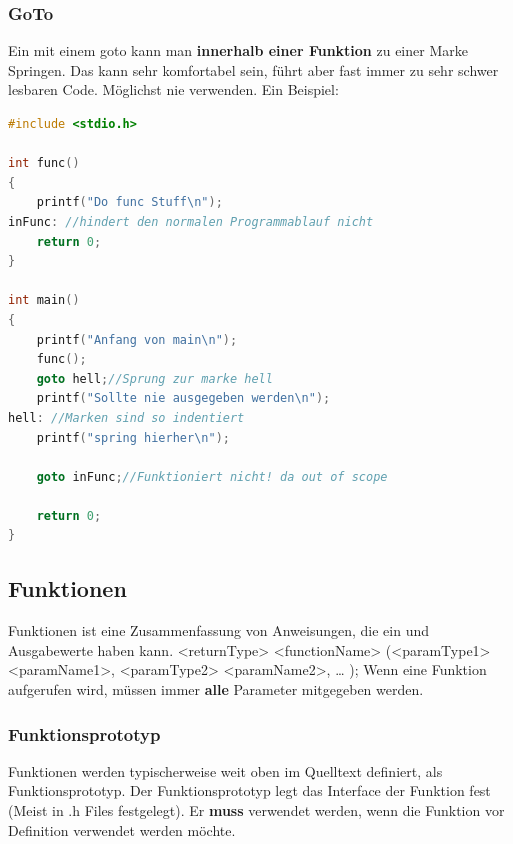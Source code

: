 \subsubsection{GoTo}

Ein mit einem goto kann man \textbf{innerhalb einer Funktion} zu einer Marke Springen. Das kann sehr komfortabel sein, führt aber fast immer zu sehr schwer lesbaren Code. Möglichst nie verwenden.\newline
Ein Beispiel:

\begin{lstlisting}[language = c]
#include <stdio.h>

int func()
{
    printf("Do func Stuff\n");
inFunc: //hindert den normalen Programmablauf nicht
    return 0;
}

int main()
{
    printf("Anfang von main\n");
    func();
    goto hell;//Sprung zur marke hell
    printf("Sollte nie ausgegeben werden\n");
hell: //Marken sind so indentiert
    printf("spring hierher\n");

    goto inFunc;//Funktioniert nicht! da out of scope
    
    return 0;
}
\end{lstlisting}

\subsection{Funktionen}

Funktionen ist eine Zusammenfassung von Anweisungen, die ein und Ausgabewerte haben kann.\newline
\textless{}returnType\textgreater{} \textless{}functionName\textgreater{} (\textless{}paramType1\textgreater{} \textless{}paramName1\textgreater{}, \textless{}paramType2\textgreater{} \textless{}paramName2\textgreater{}, … );\newline
Wenn eine Funktion aufgerufen wird, müssen immer \textbf{alle} Parameter mitgegeben werden.\newline

\subsubsection{Funktionsprototyp}

Funktionen werden typischerweise weit oben im Quelltext definiert, als Funktionsprototyp. Der Funktionsprototyp legt das Interface der Funktion fest (Meist in .h Files festgelegt). Er \textbf{muss} verwendet werden, wenn die Funktion vor Definition verwendet werden möchte.

